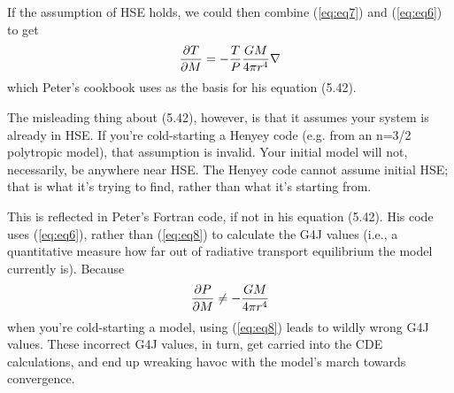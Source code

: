 \documentclass[fleqn]{article}
\begin{document}
If the assumption of HSE holds, we could then combine
(\ref{eq:eq7}) and (\ref{eq:eq6}) to get
\begin{equation}
  \frac{\partial T}{\partial M} = - \frac{T}{P} \frac{GM}{4\pi r^4} \nabla
  \label{eq:eq8}
\end{equation}
which Peter's cookbook uses as the basis for his equation (5.42).

The misleading thing about (5.42), however, is that it assumes your
system is already in HSE.  If you're cold-starting a Henyey code
(e.g. from an n=3/2 polytropic model), that assumption is invalid.
Your initial model will not, necessarily, be anywhere near HSE.  The
Henyey code cannot assume initial HSE; that is what it's trying to
find, rather than what it's starting from.

This is reflected in Peter's Fortran code, if not in his equation
(5.42).  His code uses (\ref{eq:eq6}), rather than (\ref{eq:eq8}) to
calculate the G4J values (i.e., a quantitative measure how far out of radiative transport
equilibrium the model currently is).  
Because
\begin{equation}
  \frac{\partial P}{\partial M} \neq -\frac{GM}{4\pi r^4}
  \label{eq:eq9}
\end{equation}
when you're cold-starting a model, using (\ref{eq:eq8}) leads to
wildly wrong G4J values.  These incorrect G4J values, in turn, get
carried into the CDE calculations, and end up wreaking havoc with the
model's march towards convergence.


\end{document}
